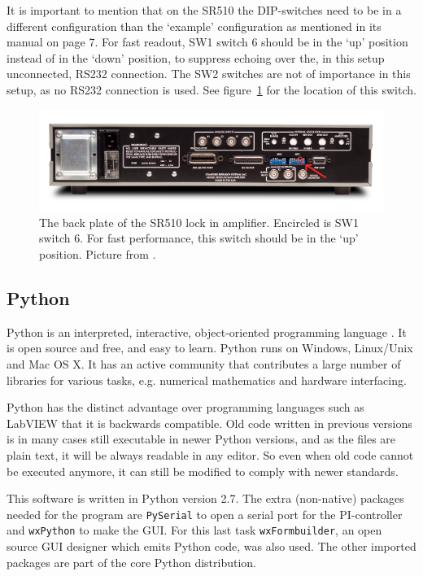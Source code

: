 It is important to mention that on the SR510 the DIP-switches need to be in a different configuration than the `example' configuration as mentioned in its manual on page 7. For fast readout, SW1 switch 6 should be in the `up' position instead of in the `down' position, to suppress echoing over the, in this setup unconnected, RS232 connection. The SW2 switches are not of importance in this setup, as no RS232 connection is used. See figure~\ref{fig:SR510_back} for the location of this switch.

\begin{figure}
 \begin{center}
  \includegraphics[width=\textwidth]{figures/SR510_Rear_circle.jpg}
  \caption{The back plate of the SR510 lock in amplifier. Encircled is SW1 switch 6. For fast performance, this switch should be in the `up' position. Picture from \cite{SR}.}
  \label{fig:SR510_back}
 \end{center}
\end{figure}



\subsection{Python}
Python is an interpreted, interactive, object-oriented programming language \cite{python}. It is open source and free, and easy to learn. Python runs on Windows, Linux/Unix and Mac OS X. It has an active community that contributes a large number of libraries for various tasks, e.g. numerical mathematics and hardware interfacing.

Python has the distinct advantage over programming languages such as LabVIEW that it is backwards compatible. Old code written in previous versions is in many cases still executable in newer Python versions, and as the files are plain text, it will be always readable in any editor. So even when old code cannot be executed anymore, it can still be modified to comply with newer standards.

This software is written in Python version 2.7. The extra (non-native) packages needed for the program are \verb!PySerial! to open a serial port for the PI-controller and \verb!wxPython! to make the GUI. For this last task \verb!wxFormbuilder!, an open source GUI designer which emits Python code, was also used. The other imported packages are part of the core Python distribution.
